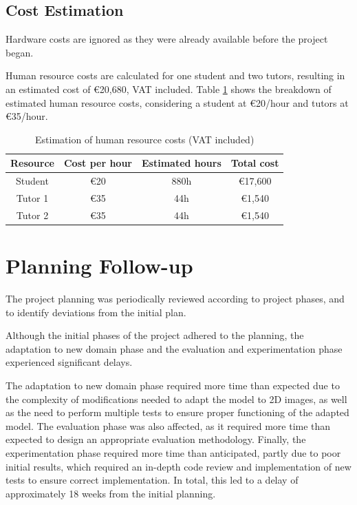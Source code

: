 \subsection{Cost Estimation}
\label{subsec:Estimación de custos}

Hardware costs are ignored as they were already available before the project began.

Human resource costs are calculated for one student and two tutors, resulting in an estimated cost of €20,680, VAT included. Table \ref{tab:estimacion_custos} shows the breakdown of estimated human resource costs, considering a student at €20/hour and tutors at €35/hour.

\begin{table}[h]
\centering
\begin{tabular}{|c|c|c|c|}
\hline
\textbf{Resource} & \textbf{Cost per hour} & \textbf{Estimated hours} & \textbf{Total cost} \\ \hline
Student & €20 & 880h & €17,600 \\ \hline
Tutor 1 & €35 & 44h & €1,540 \\ \hline
Tutor 2 & €35 & 44h & €1,540 \\ \hline
\end{tabular}
\caption{Estimation of human resource costs (VAT included)}
\label{tab:estimacion_custos}
\end{table}

\section{Planning Follow-up}
\label{sec:Seguimento da planificación}

The project planning was periodically reviewed according to project phases, and to identify deviations from the initial plan.

Although the initial phases of the project adhered to the planning, the adaptation to new domain phase and the evaluation and experimentation phase experienced significant delays.

The adaptation to new domain phase required more time than expected due to the complexity of modifications needed to adapt the model to 2D images, as well as the need to perform multiple tests to ensure proper functioning of the adapted model. The evaluation phase was also affected, as it required more time than expected to design an appropriate evaluation methodology. Finally, the experimentation phase required more time than anticipated, partly due to poor initial results, which required an in-depth code review and implementation of new tests to ensure correct implementation.
In total, this led to a delay of approximately 18 weeks from the initial planning.


